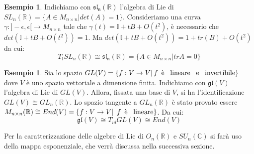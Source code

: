 \documentclass[12pt,a4paper]{report}
\theoremstyle{definition}
\theoremstyle{Theorem}
\theoremstyle{definition}
\newtheorem{Ex}[Def]{Esempio}
\theoremstyle{definition}
\theoremstyle{definition}
\begin{document}
\begin{Ex}
	Indichiamo con $\mathfrak{sl_n(\mathbb{R})}$ l'algebra di Lie di $SL_n(\mathbb{R})=\{A\in M_{n\times n}|det(A)=1\}$.
	Consideriamo una curva $\gamma:]-\epsilon,\epsilon[\rightarrow M_{n\times n}$ tale che $\gamma(t)=\mathbb{I}+tB+O(t^2)$, è necessario che $det(\mathbb{I}+tB+O(t^2))=1$. Ma $det(\mathbb{I}+tB+O(t^2))=1+tr(B)+O(t^2)$ da cui: $$T_\mathbb{I}SL_n(\mathbb{R})\cong \mathfrak{sl_n(\mathbb{R})}=\{A\in M_{n\times n}|trA=0\}$$ 
\end{Ex}
\begin{Ex}
	Sia lo spazio $GL(V)=\{f:V\rightarrow V|\, \textnormal{$f$\,  è \, lineare \, e \, invertibile}\}$ dove $V$ è uno spazio vettoriale a dimensione finita. Indichiamo con $\mathfrak{gl}(V)$ l'algebra di Lie di $GL(V)$.  Allora, fissata una base di $V$, si ha l'identificazione $GL(V)\cong GL_n(\mathbb{R})$. Lo spazio tangente a $GL_n(\mathbb{R})$ è stato provato essere $M_{n\times n}(\mathbb{R})\cong End(V)=\{f:V\rightarrow V|\textnormal{\, $f$\, è \, lineare}\}$. Da cui: 
	$$\mathfrak{gl}(V)\cong T_{id}GL(V)\cong End(V)$$ 
\end{Ex}
Per la caratterizzazione delle algebre di Lie di $O_n(\mathbb{R})$ e $SU_n(\mathbb{C})$ si farà uso della mappa esponenziale, che verrà discussa nella successiva sezione.
\end{document}
